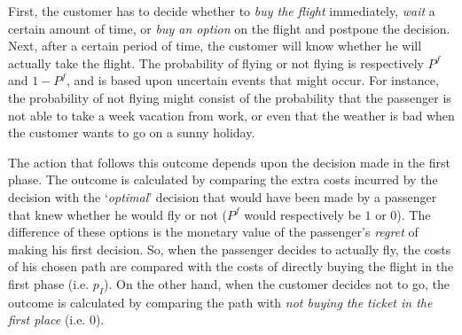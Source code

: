 
First, the customer has to decide whether to \emph{buy the flight} immediately, \emph{wait} a certain amount of time, or \emph{buy an option} on the flight and postpone the decision. Next, after a certain period of time, the customer will know whether he will actually take the flight. The probability of flying or not flying is respectively $P^f$ and $1 - P^f$, and is based upon uncertain events that might occur. For instance, the probability of not flying might consist of the probability that the passenger is not able to take a week vacation from work, or even that the weather is bad when the customer wants to go on a sunny holiday.

The action that follows this outcome depends upon the decision made in the first phase. The outcome is calculated by comparing the extra costs incurred by the decision with the `\emph{optimal}' decision that would have been made by a passenger that knew whether he would fly or not ($P^f$ would respectively be $1$ or $0$). The difference of these options is the monetary value of the passenger's \emph{regret} of making his first decision. So, when the passenger decides to actually fly, the costs of his chosen path are compared with the costs of directly buying the flight in the first phase (i.e. $p_I$). On the other hand, when the customer decides not to go, the outcome is calculated by comparing the path with \emph{not buying the ticket in the first place} (i.e. $0$).

